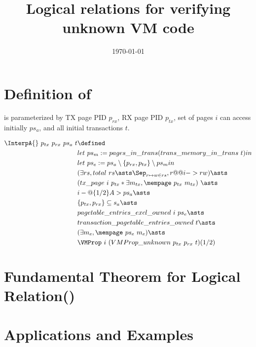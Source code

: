 \documentclass[a4paper]{article}
\title{Logical relations for verifying unknown VM code}
\date{\today}
\begin{document}
\maketitle

\section{Definition of \InterpA{}}

\InterpA{} is parameterized by TX page PID $p_{rx}$, RX page PID $p_{tx}$, set of pages $i$ can access initially $ps_{a}$, and all initial transactions $t$.

\begin{align*}
  \InterpA{} ~ p_{tx} ~ p_{rx} ~ ps_{a} ~ t & \defined \\
     & let ~ ps_{m} := pages\_in\_trans (trans\_memory\_in\_trans ~ t) in \\
     & let ~ ps_{e} := ps_{a} \setminus \{p_{rx},p_{tx}\} \setminus ps_{m} in \\
     & (\exists rs, total ~ rs \asts  \Sep_{r \mapsto w \in rs}, r @@ i ->r w) \asts \\
     & (tx\_page ~ i ~ p_{tx} \ast \exists m_{tx}, \mempage ~ p_{tx} ~ m_{tx}) ~ \asts \\
     & i -@\{1/2\}A> ps_{a} \asts \\
     & \{ p_{tx},p_{rx} \} \subseteq s_{a} \asts \\
     & pagetable\_entries\_excl\_owned ~ i ~ ps_{e} \asts \\
     & transaction\_pagetable\_entries\_owned ~ t \asts \\
     & (\exists m_{e}, \mempage ~ ps_{e} ~ m_{e}) \asts \\
     & \VMProp ~ i ~ (VMProp\_unknown ~ p_{tx} ~ p_{rx} ~ t) (1/2)
\end{align*}


\section{Fundamental Theorem for Logical Relation(\FTLR{})}

\section{Applications and Examples}
\end{document}
